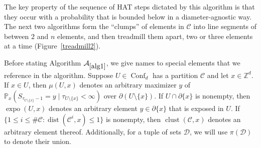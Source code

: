 \documentclass[11pt,reqno]{amsart}
\theoremstyle{definition}
\numberwithin{equation}{section}
\newcommand{\Z}{\mathbb{Z}}
\renewcommand{\P}{\mathbb{P}}
\newcommand{\1}{\mathbf{1}}
\newcommand{\bdy}{\partial}
\DeclareMathOperator{\dist}{dist}
\DeclareMathOperator{\near}{\mathrm{clust}}
\newcommand{\CC}{\mathcal{C}}
\DeclareMathOperator{\Conf}{\mathrm{Conf}}
\DeclareMathOperator{\expo}{\mathrm{expo}}
\begin{document}
The key property of the sequence of HAT steps dictated by this algorithm is that they occur with a probability that is bounded below in a diameter-agnostic way. The next two algorithms form the ``clumps'' of elements in $\CC$ into line segments of between $2$ and $n$ elements, and then treadmill them apart, two or three elements at a time (Figure~\ref{treadmill2}). 


Before stating Algorithm $\mathcal{A}_{\ref{alg1}}$, we give names to special elements that we reference in the algorithm. Suppose $U \in \Conf_d$ has a partition $\CC$ and let $x \in \Z^d$. If $x \in U$, then $\mu (U,x)$ denotes an arbitrary maximizer $y$ of $\P_x (S_{\tau_{U\setminus\{x\}}-1} = y \mid \tau_{U\setminus\{x\}} < \infty)$ over $\bdy (U{\setminus}\{x\})$. If $U \cap \bdy \{x\}$ is nonempty, then $\expo (U,x)$ denotes an arbitrary element $y \in \bdy \{x\}$ that is exposed in $U$. If $\{1 \leq i \leq \# \CC: \dist (\CC^i,x) \leq 1\}$ is nonempty, then $\near (\CC,x)$ denotes an arbitrary element thereof. 
Additionally, for a tuple of sets $\mathcal{D}$, we will use $\pi (\mathcal{D})$ to denote their union. 
\end{document}
